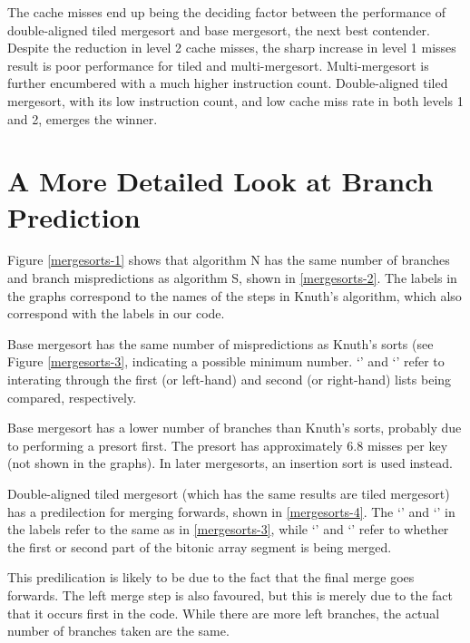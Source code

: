 The cache misses end up being the deciding factor between the performance of
double-aligned tiled mergesort and base mergesort, the next best contender.
Despite the reduction in level 2 cache misses, the sharp increase in level 1
misses result is poor performance for tiled and multi-mergesort. Multi-mergesort
is further encumbered with a much higher instruction count. Double-aligned tiled
mergesort, with its low instruction count, and low cache miss rate in both
levels 1 and 2, emerges the winner.

\section{A More Detailed Look at Branch Prediction}


Figure \ref{mergesorts-1} shows that algorithm N has the same number of branches
and branch mispredictions as algorithm S, shown in \ref{mergesorts-2}. The
labels in the graphs correspond to the names of the steps in Knuth's algorithm,
which also correspond with the labels in our code.


Base mergesort has the same number of mispredictions as Knuth's sorts (see
Figure \ref{mergesorts-3}, indicating a possible minimum number. `' and
`' refer to interating through the first (or left-hand) and second (or
right-hand) lists being compared, respectively.

Base mergesort has a lower number of branches than Knuth's sorts, probably due
to performing a presort first. The presort has approximately 6.8 misses per key
(not shown in the graphs). In later mergesorts, an insertion sort is used
instead.

Double-aligned tiled mergesort (which has the same results are tiled mergesort)
has a predilection for merging forwards, shown in \ref{mergesorts-4}. The
`' and `' in the labels refer to the same as in
\ref{mergesorts-3}, while `' and `' refer to whether the
first or second part of the bitonic array segment is being merged.

This predilication is likely to be due to the fact that the final merge goes
forwards. The left merge step is also favoured, but this is merely due to the
fact that it occurs first in the code. While there are more left branches, the
actual number of branches taken are the same.

